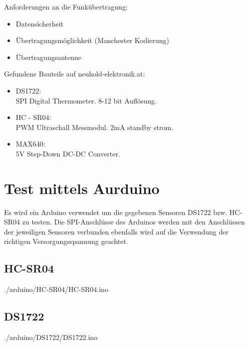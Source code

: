 \documentclass[12pt,a4paper]{article}
\begin{document}
Anforderungen an die Funkübertragung:
\begin{itemize}
	\item{Datensicherheit}
	\item{Übertragungsmöglichkeit (Manchester Kodierung)}
	\item{Übertragungsantenne}
\end{itemize}

Gefundene Bauteile auf neuhold-elektronik.at:
\begin{itemize}
	\item{DS1722}: \\
	SPI Digital Thermometer. 8-12 bit Auflösung.

	\item{HC - SR04}: \\
	PWM Ultraschall Messmodul. 2mA standby strom.
	
	\item{MAX640}: \\
	5V Step-Down DC-DC Converter.

	
\end{itemize}

\section{Test mittels Aurduino}

Es wird ein Arduino verwendet um die gegebenen Sensoren DS1722 bzw. HC-SR04 zu 
testen. Die SPI-Anschlüsse des Arduinos werden mit den Anschlüssen der
jeweiligen Sensoren verbunden ebenfalls wird auf die Verwendung der richtigen Versorgungsspannung geachtet.

\newpage
\subsection{HC-SR04}


 {./arduino/HC-SR04/HC-SR04.ino}

\newpage
\subsection{DS1722}


 {./arduino/DS1722/DS1722.ino}
\end{document}
